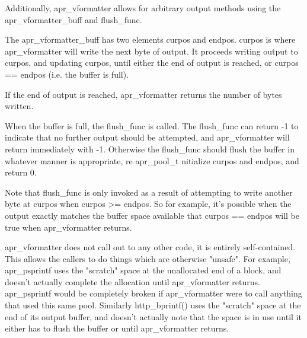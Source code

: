 \begin{DoxyPre}Additionally, apr\_vformatter allows for arbitrary output methods
using the apr\_vformatter\_buff and flush\_func.\end{DoxyPre}



\begin{DoxyPre}The apr\_vformatter\_buff has two elements curpos and endpos.
curpos is where apr\_vformatter will write the next byte of output.
It proceeds writing output to curpos, and updating curpos, until
either the end of output is reached, or curpos == endpos (i.e. the
buffer is full).\end{DoxyPre}



\begin{DoxyPre}If the end of output is reached, apr\_vformatter returns the
number of bytes written.\end{DoxyPre}



\begin{DoxyPre}When the buffer is full, the flush\_func is called.  The flush\_func
can return -1 to indicate that no further output should be attempted,
and apr\_vformatter will return immediately with -1.  Otherwise
the flush\_func should flush the buffer in whatever manner is
appropriate, re apr\_pool\_t nitialize curpos and endpos, and return 0.\end{DoxyPre}



\begin{DoxyPre}Note that flush\_func is only invoked as a result of attempting to
write another byte at curpos when curpos >= endpos.  So for
example, it's possible when the output exactly matches the buffer
space available that curpos == endpos will be true when
apr\_vformatter returns.\end{DoxyPre}



\begin{DoxyPre}apr\_vformatter does not call out to any other code, it is entirely
self-contained.  This allows the callers to do things which are
otherwise "unsafe".  For example, apr\_psprintf uses the "scratch"
space at the unallocated end of a block, and doesn't actually
complete the allocation until apr\_vformatter returns.  apr\_psprintf
would be completely broken if apr\_vformatter were to call anything
that used this same pool.  Similarly http\_bprintf() uses the "scratch"
space at the end of its output buffer, and doesn't actually note
that the space is in use until it either has to flush the buffer
or until apr\_vformatter returns.
\end{DoxyPre}


